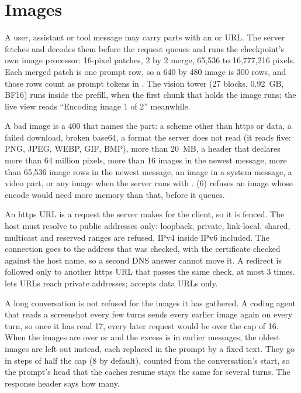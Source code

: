 \section{Images}

A user, assistant or tool message may carry  parts with an  or  URL. The server fetches and decodes them before the request queues and runs the checkpoint's own image processor: 16-pixel patches, 2 by 2 merge, 65,536 to 16,777,216 pixels. Each merged patch is one prompt row, so a 640 by 480 image is 300 rows, and those rows count as prompt tokens in . The vision tower (27 blocks, 0.92~GB, BF16) runs inside the prefill, when the first chunk that holds the image runs; the live view reads \enquote{Encoding image 1 of 2} meanwhile.

A bad image is a 400 that names the part: a scheme other than https or data, a failed download, broken base64, a format the server does not read (it reads five: PNG, JPEG, WEBP, GIF, BMP), more than 20~MB, a header that declares more than 64 million pixels, more than 16 images in the newest message, more than 65,536 image rows in the newest message, an image in a system message, a video part, or any image when the server runs with .  (6) refuses an image whose encode would need more memory than that, before it queues.

An https URL is a request the server makes for the client, so it is fenced. The host must resolve to public addresses only: loopback, private, link-local, shared, multicast and reserved ranges are refused, IPv4 inside IPv6 included. The connection goes to the address that was checked, with the certificate checked against the host name, so a second DNS answer cannot move it. A redirect is followed only to another https URL that passes the same check, at most 3 times.  lets URLs reach private addresses;  accepts data URLs only.

A long conversation is not refused for the images it has gathered. A coding agent that reads a screenshot every few turns sends every earlier image again on every turn, so once it has read 17, every later request would be over the cap of 16. When the images are over  or  and the excess is in earlier messages, the oldest images are left out instead, each replaced in the prompt by a fixed text. They go in steps of half the cap (8 by default), counted from the conversation's start, so the prompt's head that the caches resume stays the same for several turns. The response header  says how many.

